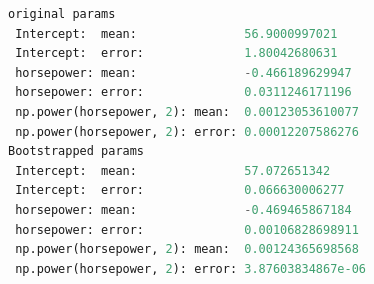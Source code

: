 \begin{lstlisting}[language=Python]
original params
 Intercept:  mean:               56.9000997021
 Intercept:  error:              1.80042680631
 horsepower: mean:               -0.466189629947
 horsepower: error:              0.0311246171196
 np.power(horsepower, 2): mean:  0.00123053610077
 np.power(horsepower, 2): error: 0.00012207586276
Bootstrapped params
 Intercept:  mean:               57.072651342
 Intercept:  error:              0.066630006277
 horsepower: mean:               -0.469465867184
 horsepower: error:              0.00106828698911
 np.power(horsepower, 2): mean:  0.00124365698568
 np.power(horsepower, 2): error: 3.87603834867e-06
\end{lstlisting}



